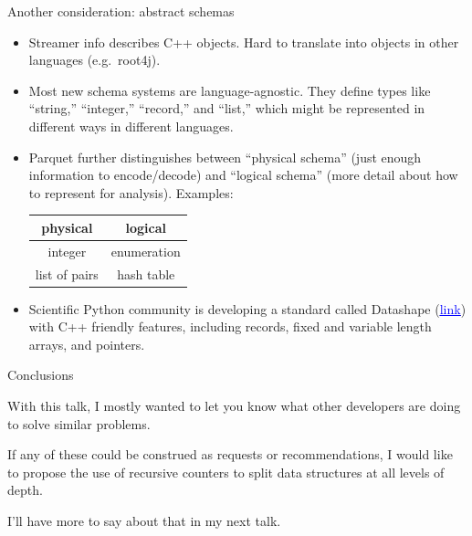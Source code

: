 \documentclass{beamer}
\begin{document}
\begin{frame}{Another consideration: abstract schemas}
\vspace{0.5 cm}
\begin{itemize}\setlength{\itemsep}{0.3 cm}
\item Streamer info describes C++ objects. Hard to translate into objects in other languages (e.g.\ root4j).

\item<2-> Most new schema systems are language-agnostic. They define types like ``string,'' ``integer,'' ``record,'' and ``list,'' which might be represented in different ways in different languages.

\item<3-> Parquet further distinguishes between ``physical schema'' (just enough information to encode/decode) and ``logical schema'' (more detail about how to represent for analysis). Examples:
\begin{center}
\begin{tabular}{c c}
physical & logical \\\hline
integer & enumeration \\
list of pairs & hash table \\
\end{tabular}
\end{center}

\item<4-> Scientific Python community is developing a standard called Datashape (\href{http://datashape.readthedocs.io/en/latest/overview.html}{\textcolor{blue}{\underline{link}}}) with C++ friendly features, including records, fixed and variable length arrays, and pointers.
\end{itemize}
\end{frame}

\begin{frame}{Conclusions}
\begin{block}{}
With this talk, I mostly wanted to let you know what other developers are doing to solve similar problems.
\end{block}

\begin{block}{}
If any of these could be construed as requests or recommendations, I would like to propose the use of recursive counters to split data structures at all levels of depth.
\end{block}

\begin{block}{}
I'll have more to say about that in my next talk.
\end{block}
\end{frame}
\end{document}
